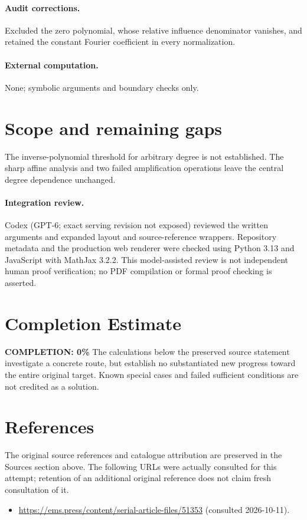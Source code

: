 \documentclass[11pt]{article}
\begin{document}
\paragraph{Audit corrections.} Excluded the zero polynomial, whose relative influence denominator vanishes, and retained the constant Fourier coefficient in every normalization.
\paragraph{External computation.} None; symbolic arguments and boundary checks only.
\section{Scope and remaining gaps}
The inverse-polynomial threshold for arbitrary degree is not established. The sharp affine analysis and two failed amplification operations leave the central degree dependence unchanged.
\paragraph{Integration review.} Codex (GPT-6; exact serving revision not exposed) reviewed the written arguments and expanded layout and source-reference wrappers. Repository metadata and the production web renderer were checked using Python 3.13 and JavaScript with MathJax 3.2.2. This model-assisted review is not independent human proof verification; no PDF compilation or formal proof checking is asserted.

\section{Completion Estimate}
\noindent\textbf{COMPLETION: 0\%}
The calculations below the preserved source statement investigate a concrete route,
but establish no substantiated new progress toward the entire original target.
Known special cases and failed sufficient conditions are not credited as a solution.
\section{References}
The original source references and catalogue attribution are preserved in the
Sources section above. The following URLs were actually consulted for this attempt;
retention of an additional original reference does not claim fresh consultation of it.
\begin{itemize}
\item \url{https://ems.press/content/serial-article-files/51353} (consulted 2026-10-11). 
\end{itemize}
\end{document}
